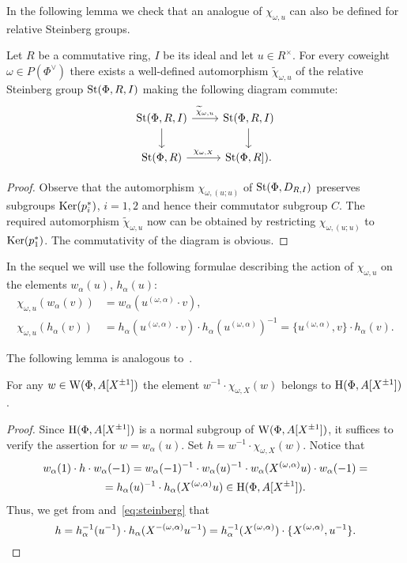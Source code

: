 In the following lemma we check that an analogue of $\chi_{\omega, u}$ can also be defined for relative Steinberg groups.
\begin{lemma} \label{lem:relative-chi}
Let $R$ be a commutative ring, $I$ be its ideal and let $u \in R^\times$.
For every coweight $\omega \in P(\Phi^\vee)$ there exists a well-defined automorphism $\widetilde{\chi}_{\omega, u}$ of the relative Steinberg group $\operatorname{St}(\Phi, R, I)$ making the following diagram commute:
\[\begin{tikzcd} \St(\Phi, R, I) \ar[r, "\widetilde{\chi}_{\omega, u}"] \ar[d] & \St(\Phi, R, I) \ar[d] \\
\St(\Phi, R) \ar[r, "\chi_{\omega, X}"] & \St(\Phi, R]). \end{tikzcd}\]
\end{lemma}
\begin{proof}
    Observe that the automorphism $\chi_{\omega, (u; u)}$ of $\operatorname{St}(\Phi, D_{R, I})$ preserves subgroups
    $\operatorname{Ker}(p_i^*)$, $i=1, 2$ and hence their commutator subgroup $C$.
    The required automorphism $\widetilde{\chi}_{\omega, u}$ now can be obtained by restricting $\chi_{\omega, (u; u)}$ to $\operatorname{Ker}(p_1^*)$.
    The commutativity of the diagram is obvious.
\end{proof}

In the sequel we will use the following formulae describing the action of $\chi_{\omega, u}$ on the elements $w_\alpha(u)$, $h_\alpha(u)$:
\begin{align}
    \label{eq:chi-w} \chi_{\omega, u}\left(w_\alpha(v)\right) &= w_\alpha(u^{(\omega, \alpha)} \cdot v), \\
    \label{eq:chi-h} \chi_{\omega, u} (h_\alpha(v)) &= h_\alpha(u^{(\omega, \alpha)} \cdot v) \cdot h_\alpha(u^{(\omega, \alpha)})^{-1} = \{u^{(\omega, \alpha)}, v\} \cdot h_\alpha(v).
\end{align}

The following lemma is analogous to~\cite[Lemma~3.1(c)]{Tu83}.
\begin{lemma} \label{lem:winv-chiw}
For any $w \in \operatorname{W}(\Phi, A[X^{\pm 1}])$ the element $w^{-1} \cdot \chi_{\omega, X}(w)$ belongs to $\operatorname{H}(\Phi, A[X^{\pm 1}])$.
\end{lemma}
\begin{proof}
    Since $\operatorname{H}(\Phi, A[X^{\pm 1}])$ is a normal subgroup of $\operatorname{W}(\Phi, A[X^{\pm 1}])$, it suffices to verify the assertion for $w = w_\alpha(u)$.
    Set $h = w^{-1} \cdot \chi_{\omega, X}(w)$.
    Notice that
    \begin{multline*} w_\alpha(1) \cdot h\cdot  w_\alpha(-1) = w_\alpha(-1)^{-1} \cdot w_\alpha(u)^{-1} \cdot w_{\alpha}(X^{(\omega, \alpha)} u) \cdot w_\alpha(-1) = \\
    = h_\alpha(u)^{-1} \cdot h_\alpha(X^{(\omega, \alpha)}u) \in \operatorname{H}(\Phi, A[X^{\pm 1}]).\end{multline*}
    Thus, we get from\cite[Lemme~5.2(b,g)]{Ma69} and~\eqref{eq:steinberg} that \[h = h_{\alpha}^{-1}(u^{-1}) \cdot h_{\alpha}(X^{-(\omega, \alpha)}u^{-1}) = h_{\alpha}^{-1}(X^{(\omega, \alpha)}) \cdot \{ X^{(\omega, \alpha)}, u^{-1} \}. \qedhere\]
\end{proof}

